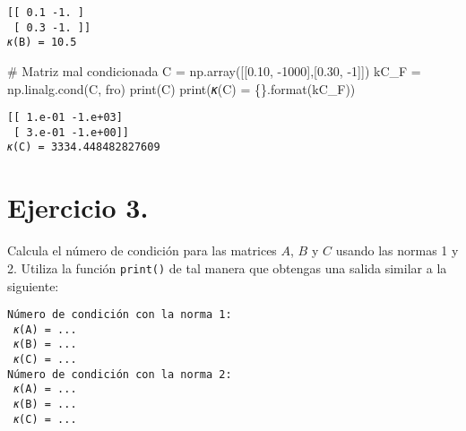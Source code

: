 \documentclass[
  letterpaper,
  DIV=11,
  numbers=noendperiod]{scrreprt}
\newenvironment{Shaded}{\begin{snugshade}}{\end{snugshade}}
\newcommand{\BuiltInTok}[1]{\textcolor[rgb]{0.00,0.23,0.31}{#1}}
\newcommand{\CommentTok}[1]{\textcolor[rgb]{0.37,0.37,0.37}{#1}}
\newcommand{\DecValTok}[1]{\textcolor[rgb]{0.68,0.00,0.00}{#1}}
\newcommand{\FloatTok}[1]{\textcolor[rgb]{0.68,0.00,0.00}{#1}}
\newcommand{\NormalTok}[1]{\textcolor[rgb]{0.00,0.23,0.31}{#1}}
\newcommand{\OperatorTok}[1]{\textcolor[rgb]{0.37,0.37,0.37}{#1}}
\newcommand{\SpecialCharTok}[1]{\textcolor[rgb]{0.37,0.37,0.37}{#1}}
\newcommand{\StringTok}[1]{\textcolor[rgb]{0.13,0.47,0.30}{#1}}
\begin{document}
\begin{verbatim}
[[ 0.1 -1. ]
 [ 0.3 -1. ]]
𝜅(B) = 10.5
\end{verbatim}

\begin{Shaded}
\begin{Highlighting}[]
\CommentTok{\# Matriz mal condicionada}
\NormalTok{C }\OperatorTok{=}\NormalTok{ np.array([[}\FloatTok{0.10}\NormalTok{, }\OperatorTok{{-}}\DecValTok{1000}\NormalTok{],[}\FloatTok{0.30}\NormalTok{, }\OperatorTok{{-}}\DecValTok{1}\NormalTok{]])}
\NormalTok{kC\_F }\OperatorTok{=}\NormalTok{ np.linalg.cond(C, }\StringTok{\textquotesingle{}fro\textquotesingle{}}\NormalTok{)}
\BuiltInTok{print}\NormalTok{(C)}
\BuiltInTok{print}\NormalTok{(}\StringTok{\textquotesingle{}𝜅(C) = }\SpecialCharTok{\{\}}\StringTok{\textquotesingle{}}\NormalTok{.}\BuiltInTok{format}\NormalTok{(kC\_F))}
\end{Highlighting}
\end{Shaded}

\begin{verbatim}
[[ 1.e-01 -1.e+03]
 [ 3.e-01 -1.e+00]]
𝜅(C) = 3334.448482827609
\end{verbatim}

\section{\texorpdfstring{\textbf{Ejercicio
3.}}{Ejercicio 3.}}\label{ejercicio-3.-1}

Calcula el número de condición para las matrices \(A\), \(B\) y \(C\)
usando las normas 1 y 2. Utiliza la función \texttt{print()} de tal
manera que obtengas una salida similar a la siguiente:

\begin{verbatim}
Número de condición con la norma 1:
 𝜅(A) = ...
 𝜅(B) = ...
 𝜅(C) = ...
Número de condición con la norma 2:
 𝜅(A) = ... 
 𝜅(B) = ...
 𝜅(C) = ...
\end{verbatim}
\end{document}
